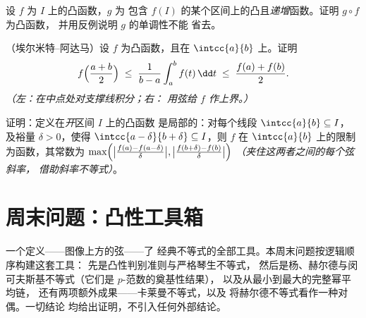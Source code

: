 \begin{exercise}[$\star$]\label{exo:b2:realfun:10}
设 $f$ 为 $I$ 上的凸函数，$g$ 为
包含 $f(I)$ 的某个区间上的凸且\emph{递增}函数。证明 $g \circ f$ 为凸函数，
并用反例说明 $g$ 的单调性不能
省去。
\end{exercise}

\begin{exercise}[$\star\star$]\label{exo:b2:realfun:11}
（埃尔米特–阿达马）设 $f$ 为凸函数，且在
$\intcc{a}{b}$ 上。证明
\[
f\Bigl(\frac{a+b}{2}\Bigr) \;\leq\; \frac{1}{b -
a}\int_a^b f(t)\,\dd t \;\leq\; \frac{f(a) + f(b)}{2} .
\]
\emph{（左：在中点处对支撑线积分；右：
用弦给 $f$ 作上界。）}
\end{exercise}

\begin{exercise}[$\star\star\star$]\label{exo:b2:realfun:12}
证明：定义在\emph{开}区间 $I$ 上的凸函数
是局部的：对每个线段 $\intcc{a}{b} \subseteq I$，
及裕量 $\delta > 0$，使得 $\intcc{a - \delta}{b + \delta}
\subseteq I$，则 $f$ 在 $\intcc{a}{b}$ 上的限制
为函数，其常数为
$\max\Bigl(\bigl|\frac{f(a) - f(a - \delta)}{\delta}\bigr|,
\bigl|\frac{f(b + \delta) - f(b)}{\delta}\bigr|\Bigr)$
\emph{（夹住这两者之间的每个弦斜率，
借助斜率不等式）}。
\end{exercise}

\section{周末问题：凸性工具箱}

一个定义——图像上方的弦——了
经典不等式的全部工具。本周末问题按逻辑顺序构建这套工具：
先是凸性判别准则与严格琴生不等式，
然后是杨、赫尔德与闵可夫斯基不等式（它们是 $p$-范数的奠基性结果），
以及从最小到最大的完整幂平均链，
还有两项额外成果——卡莱曼不等式，以及
将赫尔德不等式看作一种对偶。一切结论
均给出证明，不引入任何外部结论。

